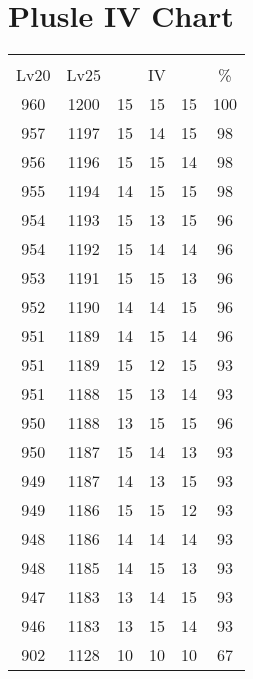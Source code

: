 \documentclass{article}%
\begin{document}
%
\normalsize%
\section{Plusle IV Chart}%
\label{sec:Plusle IV Chart}%
\renewcommand{\arraystretch}{1.5}%
\begin{tabular}{|c|c|c|c|c|c|}%
\hline%
\multicolumn{6}{|c|}{\textcolor{white}{ 
\linebreak{Plusle}
}%
\cellcolor{black}}\\%
\multicolumn{1}{|c}{Lv20}&\multicolumn{1}{c|}{Lv25}&\multicolumn{3}{c|}{IV}&\multicolumn{1}{|c|}{\%}\\%
\hline%
\rowcolor{color100}%
960&1200&15&15&15&100\\%
\hline%
\rowcolor{color98}%
957&1197&15&14&15&98\\%
\hline%
\rowcolor{color98}%
956&1196&15&15&14&98\\%
\hline%
\rowcolor{color98}%
955&1194&14&15&15&98\\%
\hline%
\rowcolor{color96}%
954&1193&15&13&15&96\\%
\hline%
\rowcolor{color96}%
954&1192&15&14&14&96\\%
\hline%
\rowcolor{color96}%
953&1191&15&15&13&96\\%
\hline%
\rowcolor{color96}%
952&1190&14&14&15&96\\%
\hline%
\rowcolor{color96}%
951&1189&14&15&14&96\\%
\hline%
\rowcolor{color93}%
951&1189&15&12&15&93\\%
\hline%
\rowcolor{color93}%
951&1188&15&13&14&93\\%
\hline%
\rowcolor{color96}%
950&1188&13&15&15&96\\%
\hline%
\rowcolor{color93}%
950&1187&15&14&13&93\\%
\hline%
\rowcolor{color93}%
949&1187&14&13&15&93\\%
\hline%
\rowcolor{color93}%
949&1186&15&15&12&93\\%
\hline%
\rowcolor{color93}%
948&1186&14&14&14&93\\%
\hline%
\rowcolor{color93}%
948&1185&14&15&13&93\\%
\hline%
\rowcolor{color93}%
947&1183&13&14&15&93\\%
\hline%
\rowcolor{color93}%
946&1183&13&15&14&93\\%
\hline%
\rowcolor{color91}%
902&1128&10&10&10&67\\%
\end{tabular}

%
\end{document}
